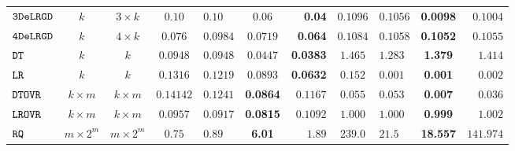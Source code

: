 {\begin {table}[t]
\begin{center}
{\begin{tabular}{|| >{\tiny}l || c | c || c | l | c | r || c | l | c | r || }
         \hhline{||-||---||-||--||----||}
         $  \mathtt{ 3DeLRGD }$ & $ k $ & $  3\times k $ & $0.10$  & $0.10$ & $0.06$ & \textbf{0.04} & $0.1096$   & $0.1056$ & \textbf{0.0098} & $0.1004$  \\
         \hhline{||-||---||-||--||----||}
         $  \mathtt{ 4DeLRGD }$ & $ k $ & $  4\times k $  & $0.076$  & $0.0984$ & $0.0719$ & \textbf{0.064}  & $0.1084$   & $0.1058$ & \textbf{0.1052} & $0.1055$   \\
         \hhline{||-||---||-||--||----||}
        $\mathtt{DT}$ & $k$ &  $k$ & $0.0948$  & $0.0948$ & $0.0447$ & \textbf{0.0383} & $ 1.465$  & $ 1.283$ & \textbf{1.379 } & {$1.414$}   \\
         \hhline{||-||---||-||--||----||}
         $\mathtt{LR}$ & $k$ &  $k$ & $0.1316$  & $0.1219$ & $ 0.0893$ & \textbf{0.0632} & $ 0.152$  &  $ 0.001$ & {\textbf{0.001}} & {$0.002$}   \\
         \hhline{||-||---||-||--||----||}
        $\mathtt{DTOVR}$ & $k \times m$ &  $ k \times m $  & $0.14142$  & $0.1241$ & \textbf{0.0864} & $ 0.1167$ &  $0.055$ & $0.053$  &  {\textbf{0.007}} & $0.036$  \\
        \hhline{||-||---||-||--||----||}
        $\mathtt{LROVR}$  & $k \times m$ &  $ k \times m $  & $0.0957$  & $0.0917$ & \textbf{0.0815} & $0.1092$  &  $ 1.000  $  &  $ 1.000 $ & {\textbf{ 0.999}} & $ 1.002 $  \\
        \hhline{||-||---||-||--||----||}
        $\mathtt{RQ}$~\cite{Jamieson2015TheAO} & $ m \times 2^m $ & $  m \times 2^m $  & $0.75$  & $0.89$ & \textbf{6.01} & $1.89$ & $239.0$   & $21.5$ & {\textbf{18.557}} & $141.974$   \\

\end{tabular}}
\end{center}
\end{table}}
